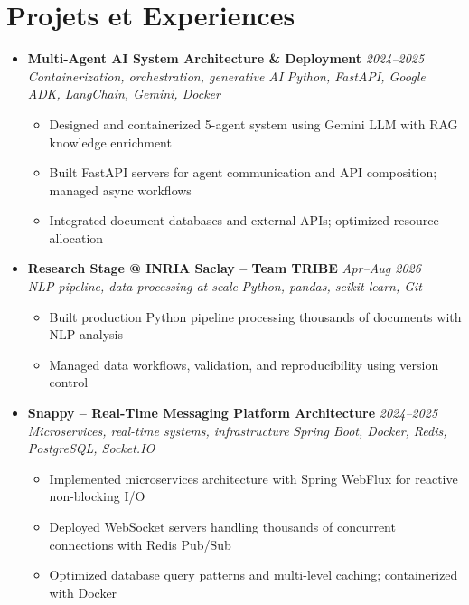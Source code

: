 \documentclass[a4paper,11pt]{article}
\begin{document}
\section{Projets et Experiences}
\begin{itemize}[leftmargin=*, label={-}]

\item \textbf{Multi-Agent AI System Architecture \& Deployment} \hfill \textit{2024--2025} \\
\textit{Containerization, orchestration, generative AI} \hfill \textit{Python, FastAPI, Google ADK, LangChain, Gemini, Docker}
\vspace{-2pt}
    \begin{itemize}[leftmargin=0.4cm, nosep, label=\tiny$\bullet$]
        \item \small{Designed and containerized 5-agent system using Gemini LLM with RAG knowledge enrichment}
        \item \small{Built FastAPI servers for agent communication and API composition; managed async workflows}
        \item \small{Integrated document databases and external APIs; optimized resource allocation}
    \end{itemize}
\vspace{3pt}

\item \textbf{Research Stage @ INRIA Saclay -- Team TRIBE} \hfill \textit{Apr--Aug 2026} \\
\textit{NLP pipeline, data processing at scale} \hfill \textit{Python, pandas, scikit-learn, Git}
\vspace{-2pt}
    \begin{itemize}[leftmargin=0.4cm, nosep, label=\tiny$\bullet$]
        \item \small{Built production Python pipeline processing thousands of documents with NLP analysis}
        \item \small{Managed data workflows, validation, and reproducibility using version control}
    \end{itemize}
\vspace{3pt}

\item \textbf{Snappy -- Real-Time Messaging Platform Architecture} \hfill \textit{2024--2025} \\
\textit{Microservices, real-time systems, infrastructure} \hfill \textit{Spring Boot, Docker, Redis, PostgreSQL, Socket.IO}
\vspace{-2pt}
    \begin{itemize}[leftmargin=0.4cm, nosep, label=\tiny$\bullet$]
        \item \small{Implemented microservices architecture with Spring WebFlux for reactive non-blocking I/O}
        \item \small{Deployed WebSocket servers handling thousands of concurrent connections with Redis Pub/Sub}
        \item \small{Optimized database query patterns and multi-level caching; containerized with Docker}
    \end{itemize}
\vspace{3pt}


\end{itemize}
\end{document}
